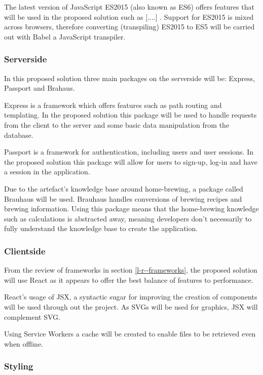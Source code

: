 The latest version of JavaScript ES2015 (also known as ES6) offers features that will be used in the proposed solution such as [....] . Support for ES2015 is mixed across browsers, therefore converting (transpiling) ES2015 to ES5 will be carried out with Babel a JavaScript transpiler. \cite{babel}

\subsubsection{Serverside} \label{a-d--t--serverside}

In this proposed solution three main packages on the serverside will be: Express, Passport and Brahaus. \cite{npm}

Express is a framework which offers features such as path routing and templating. In the proposed solution this package will be used to handle requests from the client to the server and some basic data manipulation from the database. \cite{express}

Passport is a framework for authentication, including users and user sessions. In the proposed solution this package will allow for users to sign-up, log-in and have a session in the application. \cite{passport}

Due to the artefact's knowledge base around home-brewing, a package called Brauhaus will be used. Brauhaus handles conversions of brewing recipes and brewing information. Using this package means that the home-brewing knowledge such as calculations is abstracted away, meaning developers don't necessarily to fully understand the knowledge base to create the application. \cite{brauhaus.js}

\subsubsection{Clientside} \label{a-d--t--clientside}

From the review of frameworks in section \ref{l-r--frameworks}, the proposed solution will use React as it appears to offer the best balance of features to performance.

React's usage of JSX, a syntactic sugar for improving the creation of components will be used through out the project. As SVGs will be used for graphics, JSX will complement SVG. \cite{jsx}

Using Service Workers a cache will be created to enable files to be retrieved even when offline.

\subsubsection{Styling} \label{a-d--t--styling}

